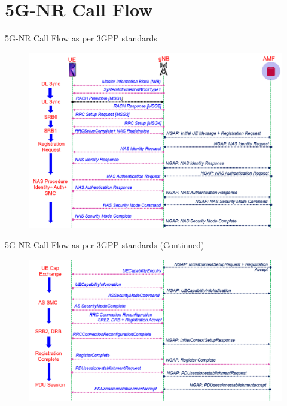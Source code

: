 \documentclass[xcolor=table]{beamer}
\begin{document}
\section{5G-NR Call Flow}
\begin{frame}{5G-NR Call Flow as per 3GPP standards}
\begin{figure}[h!]
  		\centering
  		\includegraphics[width=0.8\linewidth]{./figs/5G_Call_Flow1.png}
  		\label{5G_Call_Flow1}
	\end{figure}
\end{frame}
\begin{frame}{5G-NR Call Flow as per 3GPP standards \small{(Continued)}}
\begin{figure}[h!]
  		\centering
  		\includegraphics[width=0.8\linewidth]{./figs/5G_Call_Flow2.png}
  		\label{5G_Call_Flow2}
	\end{figure}
\end{frame}
\end{document}

